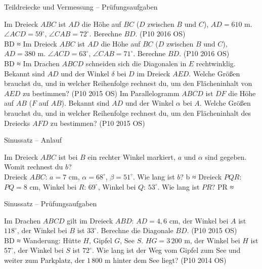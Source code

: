 \begin{aufgabe}{Teildreiecke und Vermessung – Prüfungsaufgaben}
\begin{teile}
\steil Im Dreieck $ABC$ ist $AD$ die Höhe auf $BC$ ($D$ zwischen $B$ und $C$), $AD = 610$ m. $\angle ACD = 59^\circ$, $\angle CAB = 72^\circ$. Berechne $BD$. \hfill (P10 2016 OS) \\ BD ≈ \leerfeld[m]
\steil Im Dreieck $ABC$ ist $AD$ die Höhe auf $BC$ ($D$ zwischen $B$ und $C$), $AD = 380$ m. $\angle ACD = 63^\circ$, $\angle CAB = 71^\circ$. Berechne $BD$. \hfill (P10 2016 OS) \\ BD ≈ \leerfeld[m]
\teil Im Drachen $ABCD$ schneiden sich die Diagonalen in $E$ rechtwinklig. Bekannt sind $AD$ und der Winkel $\delta$ bei $D$ im Dreieck $AED$. Welche Größen brauchst du, und in welcher Reihenfolge rechnest du, um den Flächeninhalt von $AED$ zu bestimmen? \hfill (P10 2015 OS)
\teil Im Parallelogramm $ABCD$ ist $DF$ die Höhe auf $AB$ ($F$ auf $AB$). Bekannt sind $AD$ und der Winkel $\alpha$ bei $A$. Welche Größen brauchst du, und in welcher Reihenfolge rechnest du, um den Flächeninhalt des Dreiecks $AFD$ zu bestimmen? \hfill (P10 2015 OS)
\end{teile}
\end{aufgabe}

\begin{aufgabe}{Sinussatz – Anlauf}
\begin{teile}
\teil Im Dreieck $ABC$ ist bei $B$ ein rechter Winkel markiert, $a$ und $\alpha$ sind gegeben. Womit rechnest du $b$? \\  
\teil Dreieck $ABC$: $a = 7$ cm, $\alpha = 68^\circ$, $\beta = 51^\circ$. Wie lang ist $b$? b ≈ \leerfeld[cm]
\teil Dreieck $PQR$: $PQ = 8$ cm, Winkel bei $R$: $69^\circ$, Winkel bei $Q$: $53^\circ$. Wie lang ist $PR$? PR ≈ \leerfeld[cm]
\end{teile}
\end{aufgabe}

\begin{aufgabe}{Sinussatz – Prüfungsaufgaben}
\begin{teile}
\steil Im Drachen $ABCD$ gilt im Dreieck $ABD$: $AD = 4{,}6$ cm, der Winkel bei $A$ ist $118^\circ$, der Winkel bei $B$ ist $33^\circ$. Berechne die Diagonale $BD$. \hfill (P10 2015 OS) \\ BD ≈ \leerfeld[cm]
\steil Wanderung: Hütte $H$, Gipfel $G$, See $S$. $HG = 3\,200$ m, der Winkel bei $H$ ist $57^\circ$, der Winkel bei $S$ ist $72^\circ$. Wie lang ist der Weg vom Gipfel zum See und weiter zum Parkplatz, der $1\,800$ m hinter dem See liegt? \hfill (P10 2014 OS) \\ \leerfeld[km]
\end{teile}
\end{aufgabe}

